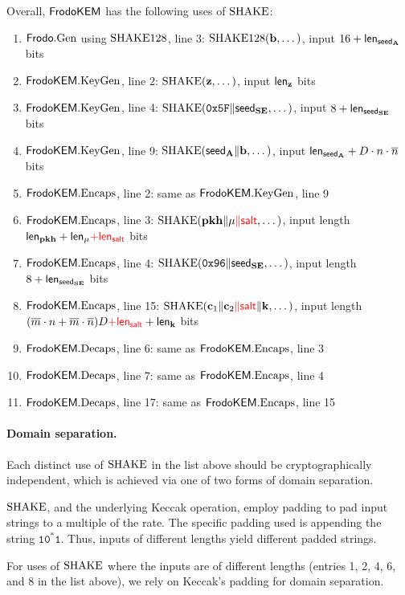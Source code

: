 \documentclass{iacrcc}
\begin{document}
Overall, $\FrodoKEM$ has the following uses of $\SHAKE$:

\begin{enumerate}
\item $\Frodo.\gen$	using $\SHAKE128$, line 3: $\SHAKE128(\bfb, \dots)$, input $16+\lengthseedA$ bits
\item $\FrodoKEM.\KeyGen$, line 2: $\SHAKE(\bfz, \dots)$, input $\lengthz$ bits
\item $\FrodoKEM.\KeyGen$, line 4: $\SHAKE(\mathtt{0x5F}\|\seedSE, \dots)$, input $8+\lengthseedSE$ bits
\item $\FrodoKEM.\KeyGen$, line 9: $\SHAKE(\seedA \| \bfb, \dots)$, input $\lengthseedA+D\cdot n \cdot \nbar$ bits
\item $\FrodoKEM.\Encaps$, line 2: same as $\FrodoKEM.\KeyGen$, line 9
\item $\FrodoKEM.\Encaps$, line 3: $\SHAKE(\pkh\|\mu{\color{red}\|\salt}, \dots)$, input length $\lengthpkhash+\lengthm{\color{red}+\lengthsalt}$ bits
\item $\FrodoKEM.\Encaps$, line 4: $\SHAKE(\mathtt{0x96}\|\seedSE, \dots)$, input length $8+\lengthseedSE$ bits
\item $\FrodoKEM.\Encaps$, line 15: $\SHAKE(\bfc_1\|\bfc_2{\color{red}\|\salt}\|\bfk, \dots)$, input length $(\mbar\cdot n+\mbar\cdot\nbar)D {\color{red}+\lengthsalt} + \lengthK$ bits
\item $\FrodoKEM.\Decaps$, line 6: same as $\FrodoKEM.\Encaps$, line 3
\item $\FrodoKEM.\Decaps$, line 7: same as $\FrodoKEM.\Encaps$, line 4
\item $\FrodoKEM.\Decaps$, line 17: same as $\FrodoKEM.\Encaps$, line 15
\end{enumerate}

\paragraph{Domain separation.}
Each distinct use of $\SHAKE$ in the list above should be cryptographically independent, which is achieved via one of two forms of domain separation.  

$\SHAKE$, and the underlying Keccak operation, employ padding to pad input strings to a multiple of the rate.  The specific padding used is appending the string $\mathtt{10^*1}$.  Thus, inputs of different lengths yield different padded strings.  

For uses of $\SHAKE$ where the inputs are of different lengths (entries 1, 2, 4, 6, and 8 in the list above), we rely on Keccak's padding for domain separation.
\end{document}
